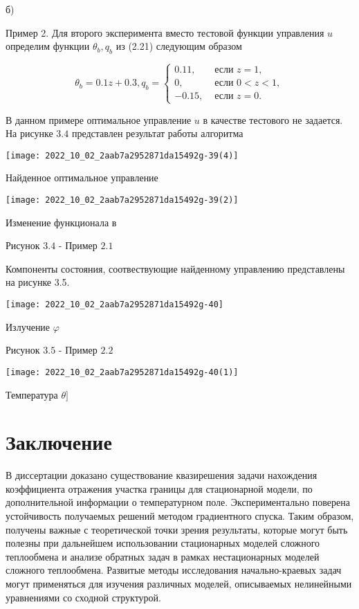 \documentclass[10pt]{article}
\begin{document}
б)

Пример 2. Для второго эксперимента вместо тестовой функции управления $u$ определим функции $\theta_{b}, q_{b}$ из (2.21) следующим образом

$$
\theta_{b}=0.1 z+0.3, q_{b}= \begin{cases}0.11, & \text { если } z=1, \\ 0, & \text { если } 0<z<1, \\ -0.15, & \text { если } z=0 .\end{cases}
$$

В данном примере оптимальное управление $u$ в качестве тестового не задается. На рисунке $3.4$ представлен результат работы алгоритма

\begin{center}
\texttt{[image: 2022\_10\_02\_2aab7a2952871da15492g-39(4)]}
\end{center}

Найденное оптимальное управление

\begin{center}
\texttt{[image: 2022\_10\_02\_2aab7a2952871da15492g-39(2)]}
\end{center}

Изменение функционала в

Рисунок $3.4$ - Пример $2.1$

Компоненты состояния, соотвествующие найденному управлению представлены на рисунке 3.5.

\begin{center}
\texttt{[image: 2022\_10\_02\_2aab7a2952871da15492g-40]}
\end{center}

Излучение $\varphi$

Рисунок $3.5$ - Пример $2.2$

\begin{center}
\texttt{[image: 2022\_10\_02\_2aab7a2952871da15492g-40(1)]}
\end{center}

Температура $\theta]$

\section{Заключение}
В диссертации доказано существование квазирешения задачи нахождения коэффициента отражения участка границы для стационарной модели, по дополнительной информации о температурном поле. Экспериментально поверена устойчивость получаемых решений методом градиентного спуска. Таким образом, получены важные с теоретической точки зрения результаты, которые могут быть полезны при дальнейшем использовании стационарных моделей сложного теплообмена и анализе обратных задач в рамках нестационарных моделей сложного теплообмена. Развитые методы исследования начально-краевых задач могут применяться для изучения различных моделей, описываемых нелинейными уравнениями со сходной структурой.
\end{document}
